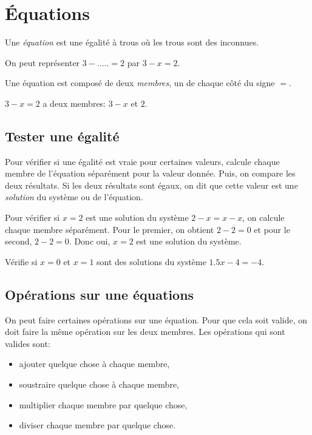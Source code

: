 \chapter{Équations}

\begin{definition}
    Une \emph{équation} est une égalité à trous où les trous sont des inconnues.
\end{definition}
\begin{exemple}
    On peut représenter $3 - ..... = 2$ par $3 - x = 2$.
\end{exemple}

\begin{definition}
    Une équation est composé de deux \emph{membres}, un de chaque côté du signe $=$.
\end{definition}
\begin{exemple}
    $3-x=2$ a deux membres: $3-x$ et $2$.
\end{exemple}

\section{Tester une égalité}

Pour vérifier si une égalité est vraie pour certaines valeurs, calcule chaque membre de l'équation séparément pour la valeur donnée. Puis, on compare les deux résultats. Si les deux résultats sont égaux, on dit que cette valeur est une \emph{solution} du système ou de l'équation.

\begin{exemple}
    Pour vérifier si $x=2$ est une solution du système $2 - x = x - x$, on calcule chaque membre séparément. Pour le premier, on obtient $2 - 2 = 0$ et pour le second, $2 - 2 = 0$. Donc oui, $x = 2$ est une solution du système.
\end{exemple}

\begin{exercice}
    Vérifie si $x = 0$ et $x = 1$ sont des solutions du système $1.5x - 4 = -4$.
\end{exercice}

\section{Opérations sur une équations}

On peut faire certaines opérations sur une équation. Pour que cela soit valide, on doit faire la même opération sur les deux membres. Les opérations qui sont valides sont:
\begin{itemize}
    \item ajouter quelque chose à chaque membre,
    \item soustraire quelque chose à chaque membre,
    \item multiplier chaque membre par quelque chose,
    \item diviser chaque membre par quelque chose.
\end{itemize}

